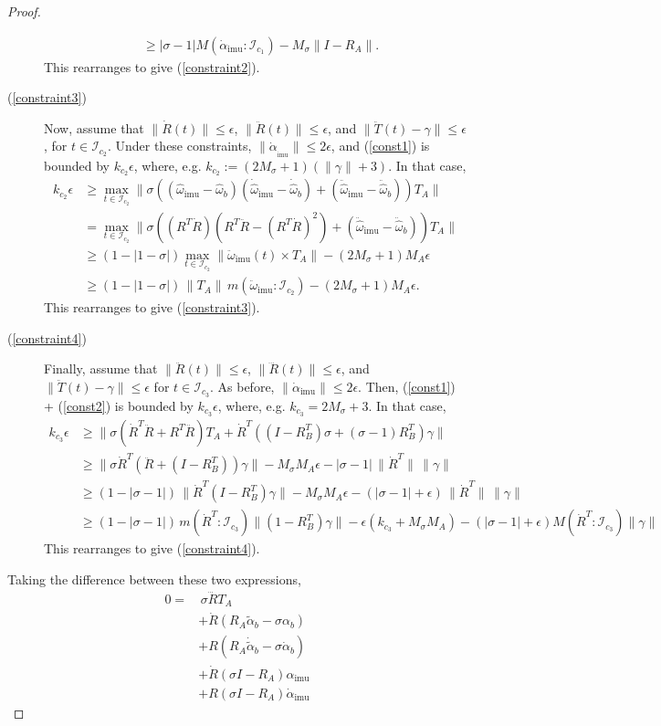 \documentclass[]{article}
\def\w{\omega}
\def\hw{{\widehat\w}}
\def\imu{_\mathrm{imu}}
\def\m{{m}}
\def\M{{M}}
\def\I{\mathcal{I}}
\begin{document}
\begin{proof}
\begin{description}
\begin{align*}
&\geq |\sigma-1|\M(\dot\alpha\imu\!:\!{\I_{c_1}}) - M_\sigma\|I-R_A\|.
\end{align*}
This rearranges to give (\ref{constraint2}). 
\item[(\ref{constraint3})]
Now, assume that
$\|\dot R(t)\|\leq\epsilon$, $\|\ddot R(t)\|\leq\epsilon$, and
$\|\ddot T(t) - \gamma\|\leq\epsilon$, for $t\in\I_{c_2}$.  Under these constraints, $\|\dot\alpha_{\imu}\|\leq2\epsilon$, and
(\ref{const1}) is bounded by $k_{c_2}\epsilon$, where, e.g. $k_{c_2}:=(2M_\sigma+1)(\|\gamma\| + 3)$.
In that case,
\begin{align*}
 k_{c_2}\epsilon&\geq\max_{t\in\I_{c_2}}\|\sigma ((\hw\imu-\hw_b)(\dot\hw\imu-\dot\hw_b) + (\ddot\hw\imu-\ddot\hw_b)) T_A\|\\
 &=\max_{t\in\I_{c_2}}\|\sigma ((R^T\dot R)(R^T\ddot R - (R^T\dot R)^2) + (\ddot\hw\imu-\ddot\hw_b)) T_A\|\\
 &\geq (1-|1-\sigma|)\!\max_{t\in\I_{c_2}}\|\ddot\w\imu(t)\times T_A\| - (2M_\sigma+1) M_A\epsilon\\
 &\geq (1-|1-\sigma|)\,\|T_A\|\,\m(\ddot\w\imu\!:\!{\I_{c_2}}) - (2M_\sigma+1) M_A\epsilon.
\end{align*}
This rearranges to give (\ref{constraint3}).
\item[(\ref{constraint4})]
Finally, assume that $\|\ddot R(t)\|\leq\epsilon$, $\|\dddot R(t)\|\leq\epsilon$, and $\|\ddot T(t) - \gamma\|\leq\epsilon$
for $t\in\I_{c_3}$.
As before, $\|\dot\alpha\imu\|\leq2\epsilon$.  Then, (\ref{const1}) + (\ref{const2}) is bounded by $k_{c_3}\epsilon$, where, e.g. $k_{c_3}=2M_\sigma+3$.
In that case,
\begin{align*}
k_{c_3}\epsilon &\geq
   \|\sigma(\dot R^T\ddot R + R^T\dddot R)T_A
  + \dot R^T((I-R_B^T)\sigma + (\sigma-1)R_B^T)\gamma\|\\
&\geq \|\sigma \dot R^T (\ddot R + (I-R^T_B))\gamma\| - M_\sigma M_A\epsilon - |\sigma-1|\,\|\dot R^T\|\,\|\gamma\|\\
&\geq (1-|\sigma-1|)\,\|\dot R^T (I-R^T_B)\gamma\| - M_\sigma M_A\epsilon - (|\sigma-1|+\epsilon)\,\|\dot R^T\|\,\|\gamma\|\\
&\geq (1-|\sigma-1|)\,\m(\dot R^T\!:\!\I_{c_3})\|(1-R_B^T)\gamma\|
- \epsilon(k_{c_3} + M_\sigma M_A) - (|\sigma-1|+\epsilon)\M(\dot R^T\!:\!\I_{c_3})\|\gamma\|
\end{align*}
This rearranges to give (\ref{constraint4}).
\end{description}
\iffalse
Taking the difference between these two expressions,
\begin{align*}
 0 = &\,\sigma\dddot R T_A \\
 &+ \dot R(R_A\tilde\alpha_b - \sigma\alpha_b)\\
 &+ R(R_A\dot{\tilde\alpha}_b - \sigma\dot\alpha_b)\\
 &+ \dot R(\sigma I - R_A)\alpha\imu\\
 &+ R(\sigma I - R_A)\dot\alpha\imu
\end{align*}



\end{proof}
\end{document}
